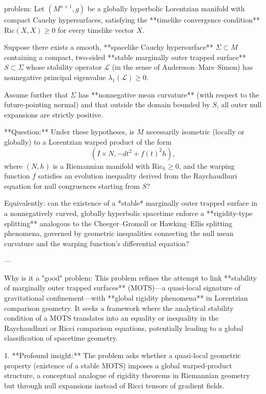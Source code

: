 problem:  
Let \((M^{n+1}, g)\) be a globally hyperbolic Lorentzian manifold with compact Cauchy hypersurfaces, satisfying the **timelike convergence condition** \(\mathrm{Ric}(X,X) \ge 0\) for every timelike vector \(X\).  

Suppose there exists a smooth, **spacelike Cauchy hypersurface** \(\Sigma \subset M\) containing a compact, two-sided **stable marginally outer trapped surface** \(S\subset\Sigma\) whose stability operator \(\mathcal{L}\) (in the sense of Andersson–Mars–Simon) has nonnegative principal eigenvalue \(\lambda_1(\mathcal{L}) \ge 0\).  

Assume further that \(\Sigma\) has **nonnegative mean curvature** (with respect to the future-pointing normal) and that outside the domain bounded by \(S\), all outer null expansions are strictly positive.  

**Question:**  
Under these hypotheses, is \(M\) necessarily isometric (locally or globally) to a Lorentzian warped product of the form  
\[
(I\times N, -dt^2 + f(t)^2 h),
\]
where \((N, h)\) is a Riemannian manifold with \(\mathrm{Ric}_h \ge 0\), and the warping function \(f\) satisfies an evolution inequality derived from the Raychaudhuri equation for null congruences starting from \(S\)?  

Equivalently: can the existence of a *stable* marginally outer trapped surface in a nonnegatively curved, globally hyperbolic spacetime enforce a **rigidity-type splitting** analogous to the Cheeger–Gromoll or Hawking–Ellis splitting phenomena, governed by geometric inequalities connecting the null mean curvature and the warping function’s differential equation?  

---

Why is it a "good" problem:  
This problem refines the attempt to link **stability of marginally outer trapped surfaces** (MOTS)—a quasi-local signature of gravitational confinement—with **global rigidity phenomena** in Lorentzian comparison geometry. It seeks a framework where the analytical stability condition of a MOTS translates into an equality or inequality in the Raychaudhuri or Ricci comparison equations, potentially leading to a global classification of spacetime geometry.  

1. **Profound insight:** The problem asks whether a quasi-local geometric property (existence of a stable MOTS) imposes a global warped-product structure, a conceptual analogue of rigidity theorems in Riemannian geometry but through null expansions instead of Ricci tensors of gradient fields.  


